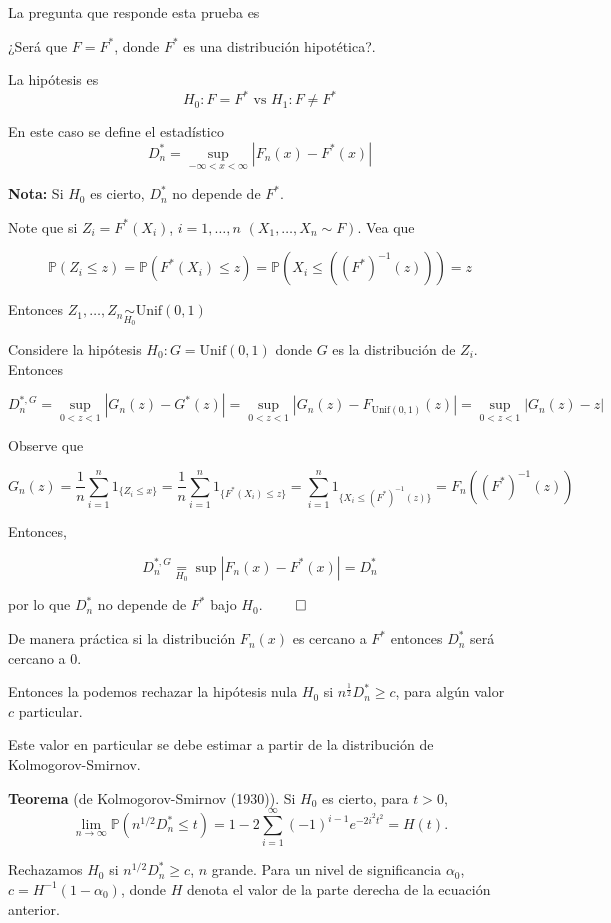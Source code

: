 \documentclass[
  12pt,
]{book}
\begin{document}
La pregunta que responde esta prueba es

¿Será que \(F = F^*\), donde \(F ^{*}\) es una distribución hipotética?.

La hipótesis es
\[
H_0: F = F^* \text{ vs } H_1: F\neq F^*
\]

En este caso se define el estadístico\\
\[
D_n^* = \sup_{-\infty<x<\infty}|F_n(x)-F^*(x)|
\]

\textbf{Nota:} Si \(H_0\) es cierto, \(D_n^*\) no depende de \(F^*\).

Note que si \(Z_i = F^*(X_i)\), \(i=1,\dots,n\) \((X_1,\dots,X_n \sim F)\). Vea que

\[
\mathbb P(Z_i\leq z) = \mathbb P(F^*(X_i)\leq z) = \mathbb P(X_i\leq
((F^*)^{-1}(z))) = z
\]

Entonces \(Z_1,\dots, Z_n \underset{H_0}{\sim} \text{Unif}(0,1)\)

Considere la hipótesis \(H_0: G = \text{Unif}(0,1)\) donde \(G\) es la distribución
de \(Z_i\). Entonces

\[D_n^{*,G} = \sup_{0<z<1}|G_n(z)-G^*(z)| =
\sup_{0<z<1}|G_n(z)-F_{\text{Unif}(0,1)}(z)| = \sup_{0<z<1}|G_n(z)-z|\]

Observe que

\[G_n(z) = \dfrac 1n \sum_{i=1}^n 1_{\{Z_i\leq x\}} = \dfrac 1n \sum_{i=1}^n
1_{\{F^*(X_i)\leq z\}} = \sum_{i=1}^n 1_{\{X_i\leq (F^*)^{-1}(z)\}} =
F_n((F^*)^{-1}(z))\]

Entonces,

\[D_n^{*,G} \underset{H_0}{=} \sup|F_n(x)-F^*(x)| = D_n^*\]

por lo que \(D_n^*\) no depende de \(F^*\) bajo \(H_0\). \(\qed\)

De manera práctica si la distribución \(F_n(x)\) es cercano a \(F ^{*}\)
entonces \(D_n ^{*}\) será cercano a 0.

Entonces la podemos rechazar la hipótesis nula \(H_0\) si
\(n^{\frac{1}{2}}D_n^*\geq c\), para algún valor \(c\) particular.

Este valor en particular se debe estimar a partir de la distribución de
Kolmogorov-Smirnov.

\textbf{Teorema} (de Kolmogorov-Smirnov (1930)). Si \(H_0\) es cierto, para \(t>0\),
\[\lim_{n\to \infty} \mathbb P(n^{1/2}D_n^*\leq t) = 1-2\sum_{i=1}^\infty
(-1)^{i-1}e^{-2i^2t^2} = H(t).\]

Rechazamos \(H_0\) si \(n^{1/2}D_n^*\geq c\), \(n\) grande. Para un nivel de
significancia \(\alpha_0\), \(c = H^{-1}(1-\alpha_0)\), donde \(H\) denota el valor de
la parte derecha de la ecuación anterior.
\end{document}

